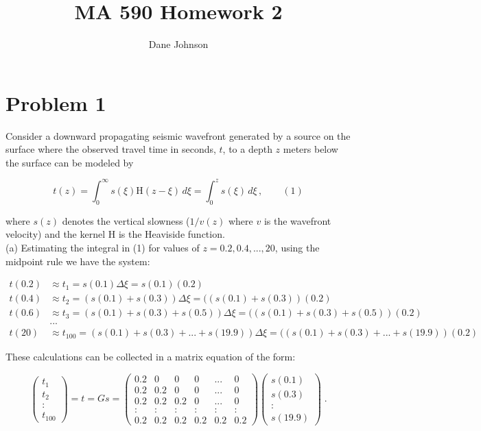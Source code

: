 \documentclass[11pt]{article}
\title{MA 590 Homework 2}
\author{Dane Johnson}
\begin{document}
\maketitle

\section*{Problem 1}

Consider a downward propagating seismic wavefront generated by a source on the surface where the observed travel time in seconds, $t$, to a depth $z$ meters below the surface can be modeled by

$$t(z) = \int_{0}^{\infty} s(\xi)\text{H}(z-\xi) \, d\xi =  \int_{0}^{z} s(\xi) \, d\xi \, ,\quad\quad (1) $$

where $s(z)$ denotes the vertical slowness ($1/v(z)$ where $v$ is the wavefront velocity) and the kernel H is the Heaviside function. \\

(a) Estimating the integral in (1) for values of $z =0.2,0.4,...,20$, using the midpoint rule we have the system:

\begin{align*}
t(0.2) &\approx t_{1} = s(0.1)\Delta \xi = s(0.1)(0.2)\\
t(0.4) &\approx t_{2} = (s(0.1) + s(0.3))\Delta \xi = ((s(0.1) + s(0.3))(0.2) \\
t(0.6) &\approx t_{3} = (s(0.1) + s(0.3) + s(0.5))\Delta \xi = ((s(0.1) + s(0.3)+s(0.5))(0.2) \\
&...\\
t(20) &\approx t_{100} = (s(0.1) + s(0.3)+ ... +s(19.9))\Delta \xi = ((s(0.1) + s(0.3)+...+s(19.9))(0.2)
\end{align*}

These calculations can be collected in a matrix equation of the form:

$$\begin{pmatrix}
t_1\\t_2\\:\\t_{100}
\end{pmatrix} = t = Gs = \begin{pmatrix}
0.2 & 0 & 0 &0  &... & 0\\
0.2 & 0.2 & 0 & 0& ... & 0\\
0.2 & 0.2 & 0.2&  0 & ... & 0\\
:&:&:&:&:&:\\
0.2 & 0.2 & 0.2 & 0.2 & 0.2&0.2
\end{pmatrix} \begin{pmatrix}
s(0.1) \\ s(0.3) \\ : \\ s(19.9)
\end{pmatrix}
 \;.$$
 
\end{document}
